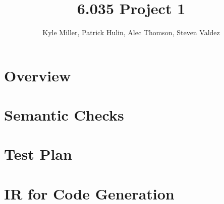 \documentclass[11pt]{article}
\title{6.035 Project 1}
\author{Kyle Miller, Patrick Hulin, Alec Thomson, Steven Valdez}
\begin{document}
\maketitle

\section{Overview} 

\section{Semantic Checks}

\section{Test Plan}

\section{IR for Code Generation}
\end{document}
